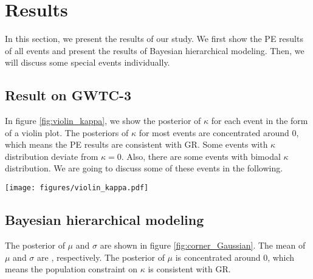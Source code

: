 \documentclass[aps,prd,twocolumn,superscriptaddress,preprintnumbers,floatfix,nofootinbib]{revtex4-2}
\begin{document}
\section{Results}
\label{sec:Results}
In this section, we present the results of our study.
We first show the PE results of all events and present the results of Bayesian hierarchical modeling.
Then, we will discuss some special events individually.

\subsection{Result on GWTC-3}
In figure \ref{fig:violin_kappa}, we show the posterior of $\kappa$ for each event in the form of a violin plot.
The posteriors of $\kappa$ for most events are concentrated around $0$, which means the PE results are consistent with GR.
Some events with $\kappa$ distribution deviate from $\kappa=0$.
Also, there are some events with bimodal $\kappa$ distribution.
We are going to discuss some of these events in the following.

\begin{figure*}[ht]
    \texttt{[image: figures/violin\_kappa.pdf]}
    \caption{
        The violin plot shows the posterior of $\kappa$ for all 69 events in this study.
        Each violin represents a different event.
        The violins are sorted by the quotient of the median and standard deviation of the posterior.
        The blue horizontal line represents the median value of $\mu$, and the blue region represents 1 $\sigma$ confidence level.
        The Orange horizontal line represents $\kappa=0$.
        This plot shows that most events are consistent with GR.
    }
    \label{fig:violin_kappa}
\end{figure*}

\subsection{Bayesian hierarchical modeling}
The posterior of $\mu$ and $\sigma$ are shown in figure \ref{fig:corner_Gaussian}.
The mean of $\mu$ and $\sigma$ are , respectively.
The posterior of $\mu$ is concentrated around $0$, which means the population constraint on $\kappa$ is consistent with GR.
\end{document}
